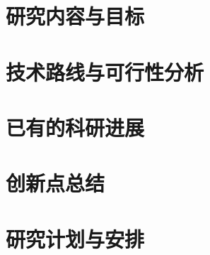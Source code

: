 \documentclass[cs4size,openany,oneside,UTF8,nofonts]{ctexbook}
\begin{document}
\newpage
\section{研究内容与目标}

\section{技术路线与可行性分析}

\section{已有的科研进展}

\section{创新点总结}

\section{研究计划与安排}

\vspace*{10pt}
\vspace*{10pt}
\end{document}
